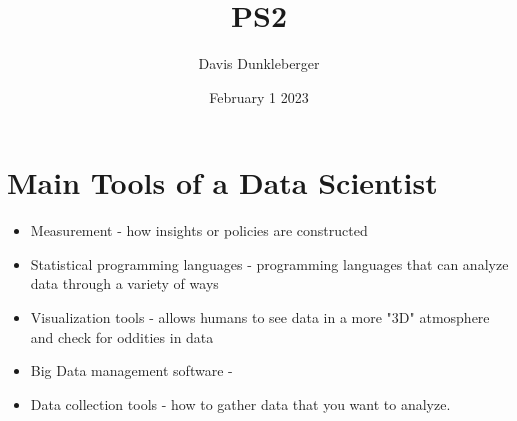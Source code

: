 \documentclass{article}
\title{PS2}
\author{Davis Dunkleberger}
\date{February 1 2023}
\begin{document}
\maketitle

\section{Main Tools of a Data Scientist}
\begin{itemize}[label=$\ast$]
    \item Measurement - how insights or policies are constructed
    \item Statistical programming languages - programming languages that can analyze data through a variety of ways
    \item Visualization tools - allows humans to see data in a more "3D" atmosphere and check for oddities in data
    \item Big Data management software - 
    \item Data collection tools - how to gather data that you want to analyze.
\end{itemize}
\end{document}
